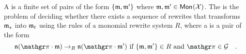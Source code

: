 \begin{definition}
  \label{def:mon-rewrite-system}
  A  is a finite set of pairs of the form
  $\set{\monelt, \monelt'}$ where $\monelt, \monelt' \in \mon{\Indets}$.
  The  is the problem of deciding whether
  there exists a sequence of rewrites that transforms $\monelt_s$ into $\monelt_t$
  using the rules of a monomial rewrite system $R$, where
  a  is a pair of the form
  \begin{equation*}
    \monelt[n] (\gelem \cdot \monelt)
    \to_R 
    \monelt[n] (\gelem \cdot \monelt')
    \text{ if } \set{\monelt, \monelt'} \in R
    \text{ and } \gelem \in \group
    \quad .
  \end{equation*}
\end{definition}


